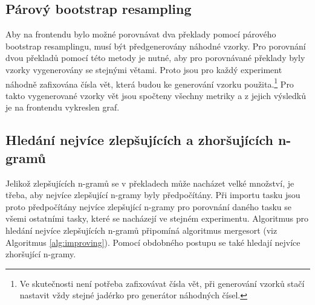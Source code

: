 \subsection{Párový bootstrap resampling}
\label{chap:bootstrap-resampling}
Aby na frontendu bylo možné porovnávat dva překlady pomocí párového bootstrap resamplingu,
  musí být předgenerovány náhodné vzorky.
Pro porovnání dvou překladů pomocí této metody je nutné,
  aby pro porovnávané překlady byly vzorky vygenerovány se stejnými větami.
Proto jsou pro každý experiment náhodně zafixována čísla vět,
  která budou ke generování vzorku použita.\footnote{
	Ve skutečnosti není potřeba zafixovávat čísla vět,
	při generování vzorků stačí nastavit vždy stejné jadérko pro generátor náhodných čísel.
  }
Pro takto vygenerované vzorky vět jsou spočteny všechny metriky a
  z jejich výsledků je na frontendu vykreslen graf.

\subsection{Hledání nejvíce zlepšujících a zhoršujících \mbox{n-gramů}}
\label{chap:improving-worsening}
Jelikož zlepšujících \mbox{n-gramů} se v překladech může nacházet velké množství,
  je třeba, aby nejvíce zlepšující \mbox{n-gramy} byly předpočítány.
Při importu tasku jsou proto předpočítány nejvíce zlepšující \mbox{n-gramy} pro porovnání daného tasku se všemi ostatními tasky,
  které se nacházejí ve stejném experimentu.
Algoritmus pro hledání nejvíce zlepšujících \mbox{n-gramů} připomíná algoritmus mergesort (viz Algoritmus \ref{alg:improving}).
Pomocí obdobného postupu se také hledají nejvíce zhoršující \mbox{n-gramy}.

